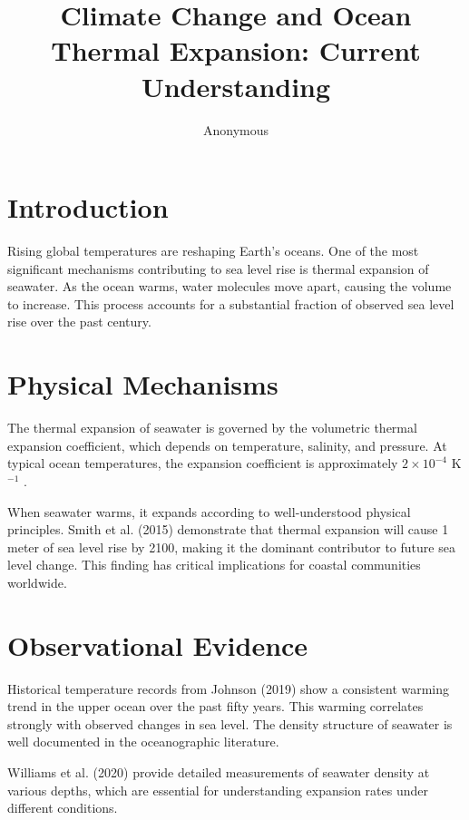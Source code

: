 \documentclass{article}
\begin{document}
\title{Climate Change and Ocean Thermal Expansion: Current Understanding}
\author{Anonymous}
\date{}
\maketitle

\section{Introduction}

Rising global temperatures are reshaping Earth's oceans. One of the most significant mechanisms
contributing to sea level rise is thermal expansion of seawater. As the ocean warms, water
molecules move apart, causing the volume to increase. This process accounts for a substantial
fraction of observed sea level rise over the past century.

\section{Physical Mechanisms}

The thermal expansion of seawater is governed by the volumetric thermal expansion coefficient,
which depends on temperature, salinity, and pressure. At typical ocean temperatures, the
expansion coefficient is approximately $2 \times 10^{-4}$ K$^{-1}$ \cite{Smith2015}.

When seawater warms, it expands according to well-understood physical principles. Smith et al.
(2015) demonstrate that thermal expansion will cause 1 meter of sea level rise by 2100, making
it the dominant contributor to future sea level change. This finding has critical implications
for coastal communities worldwide.

\section{Observational Evidence}

Historical temperature records from Johnson (2019) \cite{Johnson2018} show a consistent warming trend in the upper
ocean over the past fifty years. This warming correlates strongly with observed changes in sea
level. The density structure of seawater is well documented in the oceanographic literature.

Williams et al. (2020) \cite{Williams2020}
provide detailed measurements of seawater density at various depths, which are essential for
understanding expansion rates under different conditions.
\end{document}
